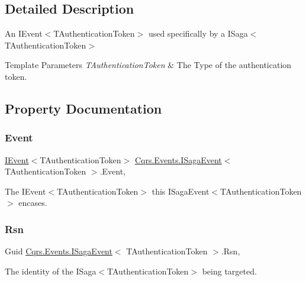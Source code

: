 \subsection{Detailed Description}
An I\+Event$<$\+T\+Authentication\+Token$>$ used specifically by a I\+Saga$<$\+T\+Authentication\+Token$>$ 


\begin{DoxyTemplParams}{Template Parameters}
{\em T\+Authentication\+Token} & The Type of the authentication token.\\
\hline
\end{DoxyTemplParams}


\subsection{Property Documentation}
\mbox{\label{interfaceCqrs_1_1Events_1_1ISagaEvent_adc0c41f6a64cadb56d758093c02ef266_adc0c41f6a64cadb56d758093c02ef266}} 
\subsubsection{\texorpdfstring{Event}{Event}}
{\footnotesize\ttfamily \hyperlink{interfaceCqrs_1_1Events_1_1IEvent}{I\+Event}$<$T\+Authentication\+Token$>$ \hyperlink{interfaceCqrs_1_1Events_1_1ISagaEvent}{Cqrs.\+Events.\+I\+Saga\+Event}$<$ T\+Authentication\+Token $>$.Event\hspace{0.3cm}{\ttfamily [get]}, {\ttfamily [set]}}



The I\+Event$<$\+T\+Authentication\+Token$>$ this I\+Saga\+Event$<$\+T\+Authentication\+Token$>$ encases. 

\mbox{\label{interfaceCqrs_1_1Events_1_1ISagaEvent_a691de8fa0a9ffccaaeb98021a6f7751b_a691de8fa0a9ffccaaeb98021a6f7751b}} 
\subsubsection{\texorpdfstring{Rsn}{Rsn}}
{\footnotesize\ttfamily Guid \hyperlink{interfaceCqrs_1_1Events_1_1ISagaEvent}{Cqrs.\+Events.\+I\+Saga\+Event}$<$ T\+Authentication\+Token $>$.Rsn\hspace{0.3cm}{\ttfamily [get]}, {\ttfamily [set]}}



The identity of the I\+Saga$<$\+T\+Authentication\+Token$>$ being targeted. 

